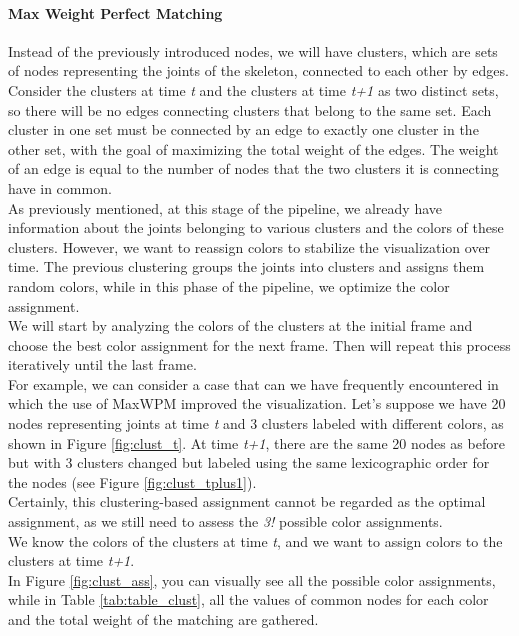 \paragraph{Max Weight Perfect Matching}
Instead of the previously introduced nodes, we will have clusters, which are sets of nodes representing the joints of the skeleton, connected to each other by edges.\\  
Consider the clusters at time \textit{t} and the clusters at time \textit{t+1} as two distinct sets, so there will be no edges connecting clusters that belong to the same set.
Each cluster in one set must be connected by an edge to exactly one cluster in the other set, with the goal of maximizing the total weight of the edges.
The weight of an edge is equal to the number of nodes that the two clusters it is connecting have in common.\\
As previously mentioned, at this stage of the pipeline, we already have information about the joints belonging to various clusters and the colors of these clusters. However, we want to reassign colors to stabilize the visualization over time.
The previous clustering groups the joints into clusters and assigns them random colors, while in this phase of the pipeline, we optimize the color assignment.\\
We will start by analyzing the colors of the clusters at the initial frame and choose the best color assignment for the next frame.
Then will repeat this process iteratively until the last frame.\\

For example, we can consider a case that can we have frequently encountered in which the use of MaxWPM improved the visualization.
Let's suppose we have 20 nodes representing joints at time \textit{t} and 3 clusters labeled with different colors, as shown in Figure \ref{fig:clust_t}.
At time \textit{t+1}, there are the same 20 nodes as before but with 3 clusters changed but labeled using the same lexicographic order for the nodes (see Figure \ref{fig:clust_tplus1}). \\
Certainly, this clustering-based assignment cannot be regarded as the optimal assignment, as we still need to assess the \textit{3!} possible color assignments. \\
We know the colors of the clusters at time \textit{t}, and we want to assign colors to the clusters at time \textit{t+1}. \\
In Figure \ref{fig:clust_ass}, you can visually see all the possible color assignments, while in Table \ref{tab:table_clust}, all the values of common nodes for each color and the total weight of the matching are gathered.


